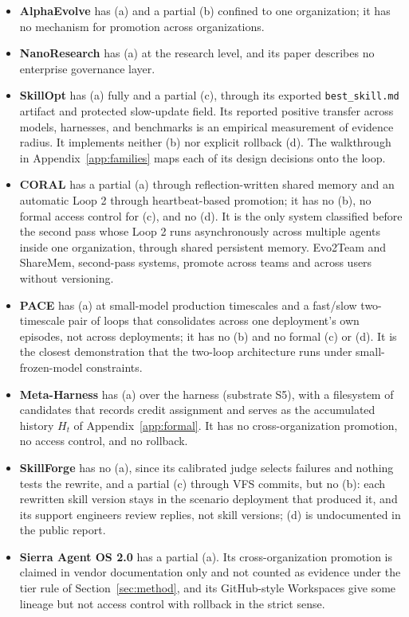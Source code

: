 \documentclass[
  11pt,
]{article}
\providecommand{\tightlist}{%
  \setlength{\itemsep}{0pt}\setlength{\parskip}{0pt}}
\begin{document}
\begin{itemize}
\tightlist
\item
  \textbf{AlphaEvolve} has (a) and a partial (b) confined to one organization; it has no mechanism for promotion across organizations.
\item
  \textbf{NanoResearch} has (a) at the research level, and its paper describes no enterprise governance layer.
\item
  \textbf{SkillOpt} has (a) fully and a partial (c), through its exported \texttt{best\_skill.md} artifact and protected slow-update field. Its reported positive transfer across models, harnesses, and benchmarks is an empirical measurement of evidence radius. It implements neither (b) nor explicit rollback (d). The walkthrough in Appendix~\ref{app:families} maps each of its design decisions onto the loop.
\item
  \textbf{CORAL} \cite{qu2026coral} has a partial (a) through reflection-written shared memory and an automatic Loop 2 through heartbeat-based promotion; it has no (b), no formal access control for (c), and no (d). It is the only system classified before the second pass whose Loop 2 runs asynchronously across multiple agents inside one organization, through shared persistent memory. Evo2Team and ShareMem, second-pass systems, promote across teams and across users without versioning.
\item
  \textbf{PACE} \cite{ling2026pace} has (a) at small-model production timescales and a fast/slow two-timescale pair of loops that consolidates across one deployment's own episodes, not across deployments; it has no (b) and no formal (c) or (d). It is the closest demonstration that the two-loop architecture runs under small-frozen-model constraints.
\item
  \textbf{Meta-Harness} \cite{lee2026metaharness} has (a) over the harness (substrate S5), with a filesystem of candidates that records credit assignment and serves as the accumulated history \(H_t\) of Appendix~\ref{app:formal}. It has no cross-organization promotion, no access control, and no rollback.
\item
  \textbf{SkillForge} has no (a), since its calibrated judge selects failures and nothing tests the rewrite, and a partial (c) through VFS commits, but no (b): each rewritten skill version stays in the scenario deployment that produced it, and its support engineers review replies, not skill versions; (d) is undocumented in the public report.
\item
  \textbf{Sierra Agent OS 2.0} has a partial (a). Its cross-organization promotion is claimed in vendor documentation only and not counted as evidence under the tier rule of Section~\ref{sec:method}, and its GitHub-style Workspaces give some lineage but not access control with rollback in the strict sense.

\end{itemize}
\end{document}
